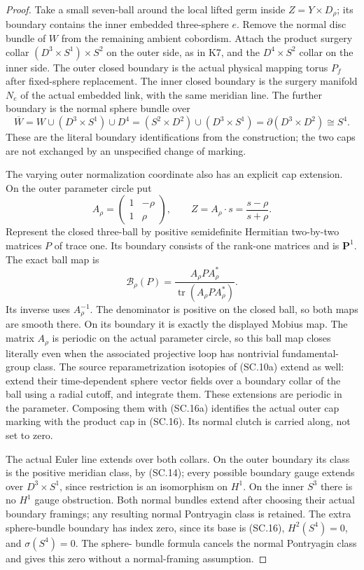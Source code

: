 \begin{proof}
Take a small seven-ball around the local lifted germ inside
\(Z=Y\times D_\rho\); its boundary contains the inner embedded
three-sphere \(e\). Remove the normal disc bundle of \(W\) from the
remaining ambient cobordism. Attach the product surgery collar
\((D^3\times S^1)\times S^2\) on the outer side, as in K7, and the
\(D^4\times S^2\) collar on the inner side. The outer closed boundary
is the actual physical mapping torus \(P_f\) after fixed-sphere
replacement. The inner closed boundary is the surgery manifold
\(N_e\) of the actual embedded link, with the same meridian line.
The further boundary is the normal sphere bundle over
\[
 \overline W=W\cup(D^3\times S^1)\cup D^4
       =(S^2\times D^2)\cup(D^3\times S^1)
       =\partial(D^3\times D^2)\cong S^4.            \tag{SC.16}
\]
These are the literal boundary identifications from the construction;
the two caps are not exchanged by an unspecified change of marking.

The varying outer normalization coordinate also has an explicit cap
extension. On the outer parameter circle put
\[
 A_\rho=\begin{pmatrix}1&-\rho\\1&\rho\end{pmatrix},
 \qquad Z=A_\rho\cdot s=\frac{s-\rho}{s+\rho}.
\]
Represent the closed three-ball by positive semidefinite Hermitian
two-by-two matrices \(P\) of trace one. Its boundary consists of the
rank-one matrices and is \(\mathbf P^1\). The exact ball map is
\[
 \mathcal B_\rho(P)
       =\frac{A_\rho P A_\rho^*}
                    {\operatorname{tr}(A_\rho P A_\rho^*)}.
                                                               \tag{SC.16a}
\]
Its inverse uses \(A_\rho^{-1}\). The denominator is positive on the
closed ball, so both maps are smooth there. On its boundary it is
exactly the displayed Mobius map. The matrix \(A_\rho\) is periodic
on the actual parameter circle, so this ball map closes literally even
when the associated projective loop has nontrivial fundamental-group
class. The source reparametrization isotopies of (SC.10a) extend as
well: extend their time-dependent sphere vector fields over a boundary
collar of the ball using a radial cutoff, and integrate them. These
extensions are periodic in the parameter. Composing them with
(SC.16a) identifies the actual outer cap marking with the product cap
in (SC.16). Its normal clutch is carried along, not set to zero.

The actual Euler line extends over both collars. On the outer boundary
its class is the positive meridian class, by (SC.14); every possible
boundary gauge extends over \(D^3\times S^1\), since restriction is
an isomorphism on \(H^1\). On the inner \(S^3\) there is no
\(H^1\) gauge obstruction. Both normal bundles extend after choosing
their actual boundary framings; any resulting normal Pontryagin class
is retained. The extra sphere-bundle boundary has index zero, since its
base is (SC.16), \(H^2(S^4)=0\), and \(\sigma(S^4)=0\). The sphere-
bundle formula cancels the normal Pontryagin class and gives this zero
without a normal-framing assumption.


\end{proof}

